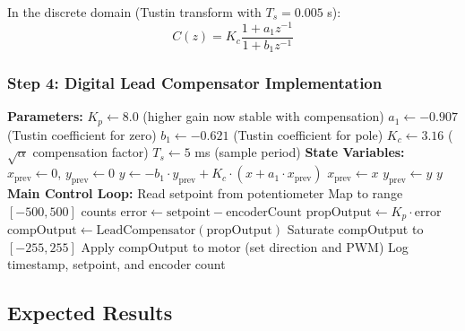 In the discrete domain (Tustin transform with $T_s = 0.005$ s):
\begin{equation}
C(z) = K_c \frac{1 + a_1 z^{-1}}{1 + b_1 z^{-1}}
\end{equation}

\subsubsection{Step 4: Digital Lead Compensator Implementation}

\begin{algorithm}
\caption{Digital Lead Compensator Implementation}
\begin{algorithmic}[1]
\State \textbf{Parameters:}
\State \hspace{1em} $K_p \gets 8.0$ (higher gain now stable with compensation)
\State \hspace{1em} $a_1 \gets -0.907$ (Tustin coefficient for zero)
\State \hspace{1em} $b_1 \gets -0.621$ (Tustin coefficient for pole)
\State \hspace{1em} $K_c \gets 3.16$ ($\sqrt{\alpha}$ compensation factor)
\State \hspace{1em} $T_s \gets 5$ ms (sample period)
\State
\State \textbf{State Variables:}
\State \hspace{1em} $x_{\text{prev}} \gets 0$, $y_{\text{prev}} \gets 0$
\State
{}
    \State $y \gets -b_1 \cdot y_{\text{prev}} + K_c \cdot (x + a_1 \cdot x_{\text{prev}})$
    \State $x_{\text{prev}} \gets x$
    \State $y_{\text{prev}} \gets y$
    \State \Return $y$
\EndFunction
\State
\State \textbf{Main Control Loop:}
\Loop
        \State Read setpoint from potentiometer
        \State Map to range $[-500, 500]$ counts
        \State $\text{error} \gets \text{setpoint} - \text{encoderCount}$
        \State $\text{propOutput} \gets K_p \cdot \text{error}$
        \State $\text{compOutput} \gets \text{LeadCompensator}(\text{propOutput})$
        \State Saturate compOutput to $[-255, 255]$
        \State Apply compOutput to motor (set direction and PWM)
        \State Log timestamp, setpoint, and encoder count
    \EndIf
\EndLoop
\end{algorithmic}
\end{algorithm}

\subsection{Expected Results}

